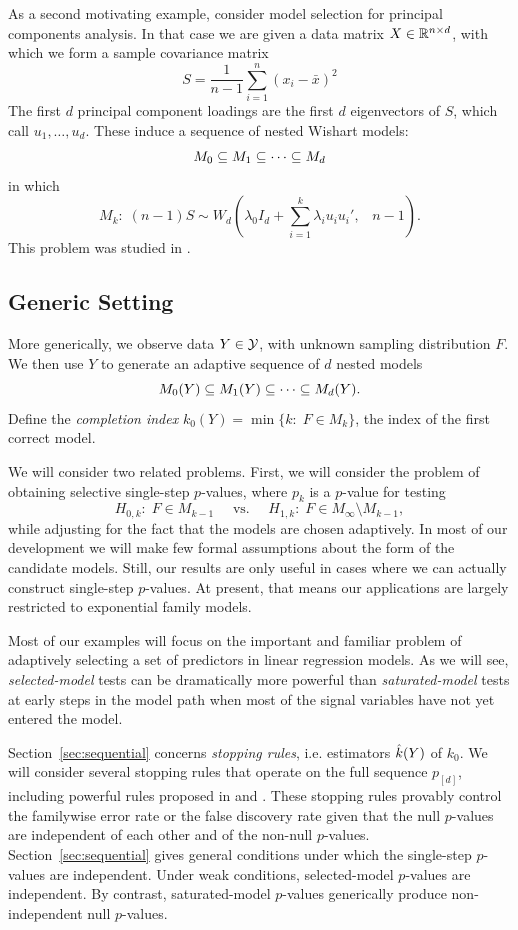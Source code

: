 \documentclass{article}
\begin{document}
\begin{example}
  As a second motivating example, consider model selection for   principal components analysis. In that case we are given a data matrix $X \in \mathbb{R}^{n\times d}$, with which we form a sample covariance matrix
\[
S = \frac{1}{n-1} \sum_{i=1}^n(x_i - \bar x)^2
\]
The first $d$ principal component loadings are the first $d$ eigenvectors of $S$, which call $u_1,\ldots, u_d$. These induce a sequence of nested Wishart models:
\[
M_0 \subseteq M_1 \subseteq \cdots \subseteq M_d
\]
in which
\begin{equation}
  M_k:\; (n-1) S \sim W_d\left(\lambda_0 I_d + \sum_{i=1}^k     \lambda_i u_i u_i', \;\;\; n-1\right).
\end{equation}
This problem was studied in \citet{choi2014selecting}.
\end{example}

\subsection{Generic Setting}

More generically, we observe data $Y \in \mathcal{Y}$, with unknown sampling distribution $F$. We then use $Y$ to generate an adaptive sequence of $d$ nested models
\[
M_0(Y) \subseteq M_1(Y) \subseteq \cdots \subseteq M_d(Y).
\]
Define the {\em completion index} $k_0(Y) = \min\{k:\; F \in M_k\}$, the index of the first correct model. 

We will consider two related problems. First, we will consider the problem of obtaining selective single-step $p$-values, where $p_k$ is a $p$-value for testing
\[
H_{0,k}:\; F\in M_{k-1}\quad \text{ vs. } \quad 
H_{1,k}:\; F\in M_\infty\setminus M_{k-1},
\]
while adjusting for the fact that the models are chosen adaptively. In most of our development we will make few formal assumptions about the form of the candidate models. Still, our results are only useful in cases where we can actually construct single-step $p$-values. At present, that means our applications are largely restricted to exponential family models.

Most of our examples will focus on the important and familiar problem of adaptively selecting a set of predictors in linear regression models. As we will see, {\em selected-model} tests can be dramatically more powerful than {\em saturated-model} tests at early steps in the model path when most of the signal variables have not yet entered the model.

Section~\ref{sec:sequential} concerns {\em stopping rules}, i.e. estimators $\hat{k}(Y)$ of $k_0$. We will consider several stopping rules that operate on the full sequence $p_{[d]}$, including powerful rules proposed in \citet{gsell2013sequential} and \citet{li2015accumulation}. These stopping rules provably control the familywise error rate or the false discovery rate given that the null $p$-values are independent of each other and of the non-null $p$-values. Section~\ref{sec:sequential} gives general conditions under which the single-step $p$-values are independent. Under weak conditions, selected-model $p$-values are independent. By contrast, saturated-model $p$-values generically produce non-independent null $p$-values.
\end{document}
